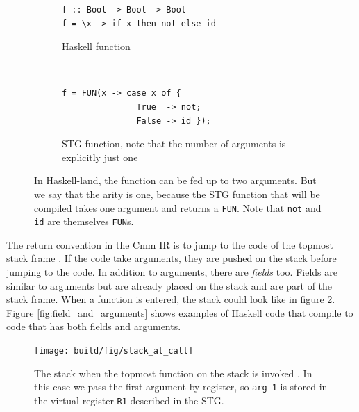 \begin{figure}
\begin{mdframed}
        \begin{subfigure}[t]{0.5\textwidth}
          \begin{verbatim}
f :: Bool -> Bool -> Bool
f = \x -> if x then not else id
          \end{verbatim}
          \caption{Haskell function}
        \end{subfigure}
    ~ %
        \begin{subfigure}[t]{0.5\textwidth}
          \begin{verbatim}
f = FUN(x -> case x of {
               True  -> not;
               False -> id });
          \end{verbatim}
          \caption{STG function, note that the number of arguments is
explicitly just one}
        \end{subfigure}
  \caption{In Haskell-land, the function can be fed up to two arguments.
  But we say that the arity is one, because the STG function that will be
  compiled takes one argument and returns a \texttt{FUN}. Note that \texttt{not}
  and \texttt{id} are themselves \texttt{FUN}s.
 }
  \label{fig:tricky_arity}
\end{mdframed}
\end{figure}

The return convention in the Cmm IR is to
jump to the code of the topmost stack frame \cite{commentary_return_convention}.
If the code take arguments, they are pushed on the stack before jumping to the code.
In addition to arguments, there are \emph{fields} too.
Fields are similar to arguments but are already placed on the stack
and are part of the stack frame. When a function is entered,
the stack could look like in figure \ref{fig:stack_at_call}. Figure \ref{fig:field_and_arguments} shows examples
of Haskell code that compile to code
that has both fields and arguments.

\begin{figure}
\begin{mdframed}
  \texttt{[image: build/fig/stack\_at\_call]}
  \caption{The stack when the topmost function on the stack is invoked \cite{github_stack_at_call}.
In this case we pass the first argument by register, so \texttt{arg 1}
is stored in the virtual register \texttt{R1} described in the STG.}
  \label{fig:stack_at_call}
\end{mdframed}
\end{figure}

